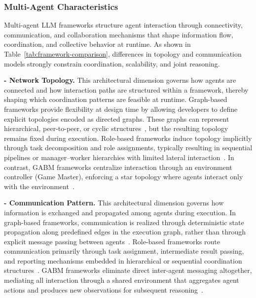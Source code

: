 \subsubsection{Multi-Agent Characteristics}
Multi-agent LLM frameworks structure agent interaction through connectivity, communication, and collaboration mechanisms that shape information flow, coordination, and collective behavior at runtime. As shown in Table~\ref{tab:framework-comparison}, differences in topology and communication models strongly constrain coordination, scalability, and joint reasoning.


\smallskip
\noindent\textbf{- Network Topology.}
This architectural dimension governs how agents are connected and how interaction paths are structured within a framework, thereby shaping which coordination patterns are feasible at runtime. Graph-based frameworks provide flexibility at design time by allowing developers to define explicit topologies encoded as directed graphs. These graphs can represent hierarchical, peer-to-peer, or cyclic structures~\cite{langgraph2025,autogpt2025}, but the resulting topology remains fixed during execution. Role-based frameworks induce topology implicitly through task decomposition and role assignments, typically resulting in sequential pipelines or manager--worker hierarchies with limited lateral interaction~\cite{crewai2025,wu2024autogen,openaiagents2025}. In contrast, GABM frameworks centralize interaction through an environment controller (Game Master), enforcing a star topology where agents interact only with the environment~\cite{vezhnevets2023generative}.


\noindent\textbf{- Communication Pattern.}
This architectural dimension governs how information is exchanged and propagated among agents during execution. In graph-based frameworks, communication is realized through deterministic state propagation along predefined edges in the execution graph, rather than through explicit message passing between agents~\cite{langgraph2025,n8n2025,langflow2025}. Role-based frameworks route communication primarily through task assignment, intermediate result passing, and reporting mechanisms embedded in hierarchical or sequential coordination structures~\cite{crewai2025,wu2024autogen,openaiagents2025}. GABM frameworks eliminate direct inter-agent messaging altogether, mediating all interaction through a shared environment that aggregates agent actions and produces new observations for subsequent reasoning~\cite{vezhnevets2023generative}.


